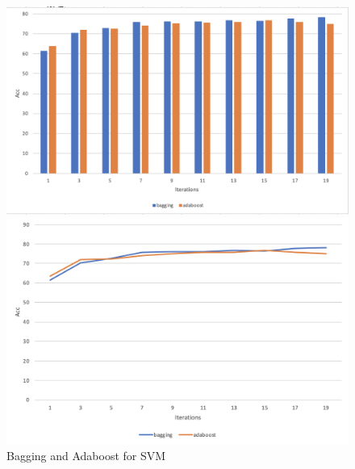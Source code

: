 \documentclass[paper=a4, fontsize=11pt, UTF8]{article} %
\begin{document}
\begin{figure}[H]
	\centering %
	\begin{minipage}[b]{0.45\textwidth} %
		\centering %
		\includegraphics[scale=0.3]{./photos/dtree1.png} %
	\end{minipage}
	\begin{minipage}[b]{0.45\textwidth} %
		\centering %
		\includegraphics[scale=0.3]{./photos/dtree2.png}%
    \end{minipage}
    \caption{Bagging and Adaboost for SVM}
    \label{svm}
\end{figure}
\end{document}
